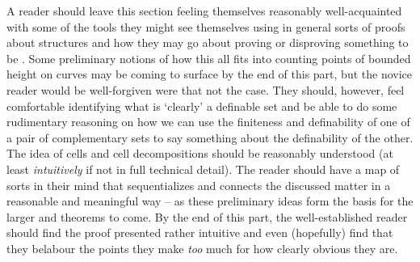 A reader should leave this section feeling themselves reasonably well-acquainted with some of the tools they might see themselves using in general sorts of proofs about \om structures and how they may go about proving or disproving something to be \om. Some preliminary notions of how this all fits into counting points of bounded height on curves may be coming to surface by the end of this part, but the novice reader would be well-forgiven were that not the case. They should, however, feel comfortable identifying what is `clearly' a definable set and be able to do some rudimentary reasoning on how we can use the finiteness and definability of one of a pair of complementary sets to say something about the definability of the other. The idea of cells and cell decompositions should be reasonably understood (at least \emph{intuitively} if not in full technical detail). The reader should have a map of sorts in their mind that sequentializes and connects the discussed matter in a reasonable and meaningful way -- as these preliminary ideas form the basis for the larger \lemmas and theorems to come. By the end of this part, the well-established reader should find the proof presented rather intuitive and even (hopefully) find that they belabour the points they make \emph{too} much for how clearly obvious they are.


  
  
  
  
  
  
  


  
  
  
  
  

  
  
  